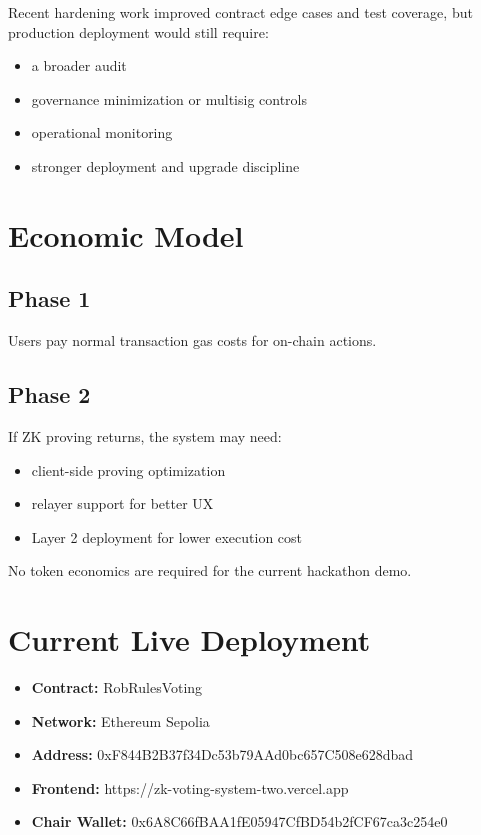 \documentclass[12pt]{article}
\begin{document}
Recent hardening work improved contract edge cases and test coverage, but production deployment would still require:
\begin{itemize}
    \item a broader audit
    \item governance minimization or multisig controls
    \item operational monitoring
    \item stronger deployment and upgrade discipline
\end{itemize}

\section{Economic Model}

\subsection{Phase 1}
Users pay normal transaction gas costs for on-chain actions.

\subsection{Phase 2}
If ZK proving returns, the system may need:
\begin{itemize}
    \item client-side proving optimization
    \item relayer support for better UX
    \item Layer 2 deployment for lower execution cost
\end{itemize}

No token economics are required for the current hackathon demo.

\section{Current Live Deployment}

\begin{itemize}
    \item \textbf{Contract:} RobRulesVoting
    \item \textbf{Network:} Ethereum Sepolia
    \item \textbf{Address:} 0xF844B2B37f34Dc53b79AAd0bc657C508e628dbad
    \item \textbf{Frontend:} https://zk-voting-system-two.vercel.app
    \item \textbf{Chair Wallet:} 0x6A8C66fBAA1fE05947CfBD54b2fCF67ca3c254e0
\end{itemize}
\end{document}
